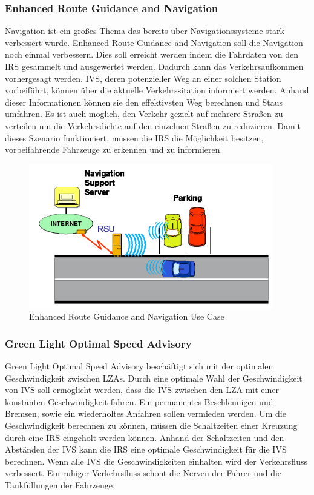 \subsubsection{Enhanced Route Guidance and Navigation}
Navigation ist ein großes Thema das bereits über Navigationssysteme stark verbessert wurde. Enhanced Route Guidance and Navigation soll die Navigation noch einmal verbessern. Dies soll erreicht werden indem die Fahrdaten von den \ac{IRS} gesammelt und ausgewertet werden. Dadurch kann das Verkehrsaufkommen vorhergesagt werden. \ac{IVS}, deren potenzieller Weg an einer solchen Station vorbeiführt, können über die aktuelle Verkehrssitation informiert werden. Anhand dieser Informationen können sie den effektivsten Weg berechnen und Staus umfahren. Es ist auch möglich, den Verkehr gezielt auf mehrere Straßen zu verteilen um die Verkehrsdichte auf den einzelnen Straßen zu reduzieren. Damit dieses Szenario funktioniert, müssen die \ac{IRS} die Möglichkeit besitzen, vorbeifahrende Fahrzeuge zu erkennen und zu informieren. 

\begin{figure}[htbp]
\includegraphics[width=0.95\textwidth]{content/images/06_use_cases/ergn.png}
\caption{Enhanced Route Guidance and Navigation Use Case \cite{etsi102638}}
\label{fig:ergn}
\end{figure}
\subsubsection{Green Light Optimal Speed Advisory}
Green Light Optimal Speed Advisory beschäftigt sich mit der optimalen Geschwindigkeit zwischen \acp{LZA}. Durch eine optimale Wahl der Geschwindigkeit von \ac{IVS} soll ermöglicht werden, dass die \ac{IVS} zwischen den \ac{LZA} mit einer konstanten Geschwindigkeit fahren. Ein permanentes Beschleunigen und Bremsen, sowie ein wiederholtes Anfahren sollen vermieden werden. Um die Geschwindigkeit berechnen zu können, müssen die Schaltzeiten einer Kreuzung durch eine \ac{IRS} eingeholt werden können. Anhand der Schaltzeiten und den Abständen der \ac{IVS} kann die \ac{IRS} eine optimale Geschwindigkeit für die \ac{IVS} berechnen. Wenn alle \ac{IVS} die Geschwindigkeiten einhalten wird der Verkehrsfluss verbessert. Ein ruhiger Verkehrsfluss schont die Nerven der Fahrer und die Tankfüllungen der Fahrzeuge.

